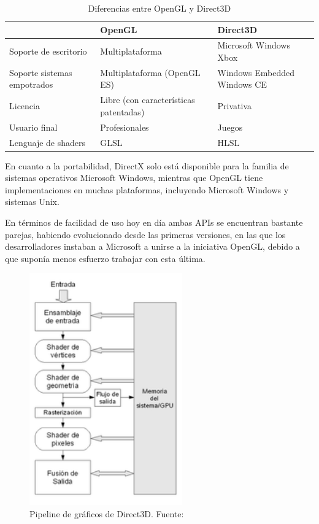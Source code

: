 \begin{table}[h]
	\centering
	\begin{tabular}{ | m{4cm} | m{5cm} | m{5cm} | }
		\hline
		& OpenGL & Direct3D \\
		\hline
		Soporte de escritorio & Multiplataforma & Microsoft Windows Xbox
		\\
		\hline
		Soporte sistemas empotrados & Multiplataforma (OpenGL ES) & Windows
		Embedded Windows CE \\
		\hline
		Licencia & Libre (con características patentadas) & Privativa
		\\
		\hline
		Usuario final & Profesionales & Juegos \\ 
		\hline
		Lenguaje de shaders & GLSL & HLSL \\
		\hline
	\end{tabular}
	\caption{Diferencias entre OpenGL y Direct3D}
	\label{tabla2.1}
\end{table}

En cuanto a la portabilidad, DirectX solo está disponible para la familia de
sistemas operativos Microsoft Windows, mientras que OpenGL tiene
implementaciones en muchas plataformas, incluyendo Microsoft Windows y sistemas
Unix.

En términos de facilidad de uso hoy en día ambas APIs se encuentran bastante
parejas, habiendo evolucionado desde las primeras versiones, en las que los
desarrolladores instaban a Microsoft a unirse a la iniciativa OpenGL, debido a
que suponía menos esfuerzo trabajar con esta última.

\begin{figure}
	\centering
	\includegraphics[height=10cm]{figures/directxpipeline.png}
	\caption[Pipeline de gráficos de Direct3D.]{Pipeline de gráficos de
	Direct3D. Fuente:~\cite{3dpipelineimage}}
	\label{fig:differences}
\end{figure}

